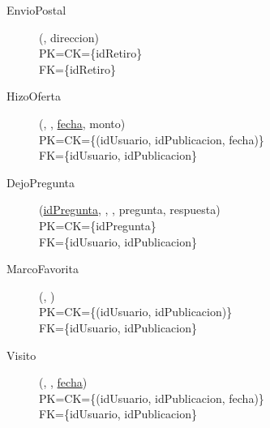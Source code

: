 \begin{description}
 \item[EnvioPostal](\underline{}, direccion)\\
PK=CK=\{idRetiro\}\\
FK=\{idRetiro\}\\


  \item[HizoOferta](\underline{}, \underline{}, \underline{fecha}, monto)\\
PK=CK=\{(idUsuario, idPublicacion, fecha)\}\\
FK=\{idUsuario, idPublicacion\}\\

  \item[DejoPregunta](\underline{idPregunta}, , , pregunta, respuesta)\\
PK=CK=\{idPregunta\}\\
FK=\{idUsuario, idPublicacion\}\\

  \item[MarcoFavorita](\underline{}, \underline{})\\
PK=CK=\{(idUsuario, idPublicacion)\}\\
FK=\{idUsuario, idPublicacion\}\\

  \item[Visito](\underline{}, \underline{}, \underline{fecha})\\
PK=CK=\{(idUsuario, idPublicacion, fecha)\}\\
FK=\{idUsuario, idPublicacion\}\\

\end{description}

\newpage
